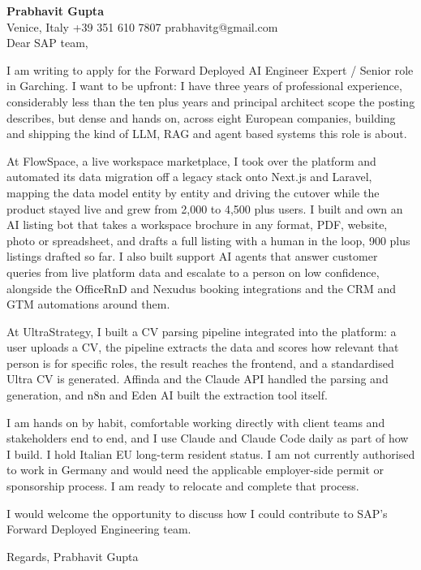 \documentclass[a4paper,10.5pt]{article}
\begin{document}
\textbf{Prabhavit Gupta}\\
Venice, Italy \textbar{} +39 351 610 7807 \textbar{} prabhavitg@gmail.com\\[10pt]
Dear SAP team,

I am writing to apply for the Forward Deployed AI Engineer Expert / Senior role in Garching. I want to be upfront: I have three years of professional experience, considerably less than the ten plus years and principal architect scope the posting describes, but dense and hands on, across eight European companies, building and shipping the kind of LLM, RAG and agent based systems this role is about.

At FlowSpace, a live workspace marketplace, I took over the platform and automated its data migration off a legacy stack onto Next.js and Laravel, mapping the data model entity by entity and driving the cutover while the product stayed live and grew from 2,000 to 4,500 plus users. I built and own an AI listing bot that takes a workspace brochure in any format, PDF, website, photo or spreadsheet, and drafts a full listing with a human in the loop, 900 plus listings drafted so far. I also built support AI agents that answer customer queries from live platform data and escalate to a person on low confidence, alongside the OfficeRnD and Nexudus booking integrations and the CRM and GTM automations around them.

At UltraStrategy, I built a CV parsing pipeline integrated into the platform: a user uploads a CV, the pipeline extracts the data and scores how relevant that person is for specific roles, the result reaches the frontend, and a standardised Ultra CV is generated. Affinda and the Claude API handled the parsing and generation, and n8n and Eden AI built the extraction tool itself.

I am hands on by habit, comfortable working directly with client teams and stakeholders end to end, and I use Claude and Claude Code daily as part of how I build. I hold Italian EU long-term resident status. I am not currently authorised to work in Germany and would need the applicable employer-side permit or sponsorship process. I am ready to relocate and complete that process.

I would welcome the opportunity to discuss how I could contribute to SAP's Forward Deployed Engineering team.

Regards,
Prabhavit Gupta
\end{document}

